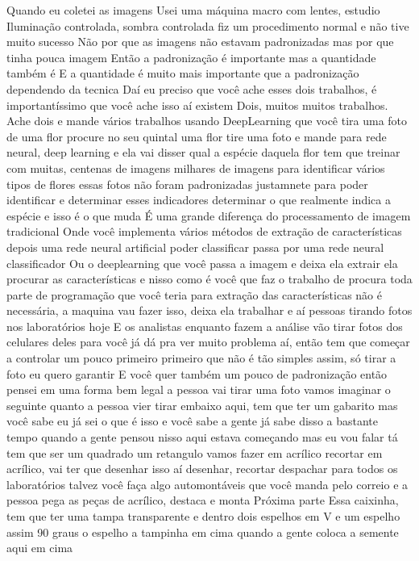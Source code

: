 Quando eu coletei as imagens
Usei uma máquina macro com lentes, estudio
Iluminação controlada, sombra controlada
fiz um procedimento normal e não tive muito sucesso
Não por que as imagens não estavam padronizadas
mas por que tinha pouca imagem
Então a padronização é importante
mas a quantidade também é
E a quantidade é muito mais importante que a padronização dependendo da tecnica
Daí eu preciso que você ache esses dois trabalhos, é importantíssimo que você ache isso aí
existem
Dois, muitos muitos trabalhos. Ache dois e mande
vários trabalhos usando DeepLearning
que você tira uma foto de uma flor
procure no seu quintal uma flor
tire uma foto
e mande para rede neural, deep learning
e ela vai disser qual a espécie daquela flor
tem que treinar com muitas, centenas de imagens
milhares de imagens
para identificar vários tipos de flores
essas fotos não foram padronizadas
justamnete para poder identificar
e determinar esses indicadores
determinar o que realmente indica
a espécie
e isso é o que muda
É uma grande diferença do processamento de imagem tradicional
Onde você implementa vários métodos de extração de características
depois uma rede neural artificial poder classificar
passa por uma rede neural classificador
Ou o deeplearning que você passa a imagem e deixa ela extrair
ela procurar as características
e nisso como é você que faz o trabalho de procura
toda parte
de programação
que você teria para extração das características
não é necessária, a maquina vau fazer isso, deixa ela trabalhar
e aí
pessoas tirando fotos
nos laboratórios hoje
E os analistas enquanto fazem a análise vão tirar fotos dos celulares deles para você
já dá pra ver muito problema aí, então tem que começar a controlar um pouco
primeiro
primeiro que não é tão simples assim, só tirar a foto
eu quero garantir
E você quer também
um pouco de padronização
então pensei em uma forma bem legal
a pessoa vai tirar uma foto
vamos imaginar o seguinte
quanto a pessoa vier tirar
embaixo aqui, tem que ter um gabarito
mas você sabe
eu já sei o que é isso e você sabe
a gente já sabe disso a bastante tempo
quando a gente pensou nisso aqui
estava começando
mas eu vou falar tá
tem que ser um quadrado
um retangulo
vamos fazer em acrílico
recortar em acrílico, vai ter que desenhar isso aí
desenhar, recortar
despachar para todos os laboratórios
talvez você faça algo automontáveis
que você manda pelo correio e a pessoa pega as peças de acrílico, destaca e monta
Próxima parte
Essa caixinha, tem que ter uma tampa transparente e dentro dois espelhos em V
e um espelho assim
90 graus
o espelho
a tampinha em cima
quando a gente coloca a semente aqui em cima
